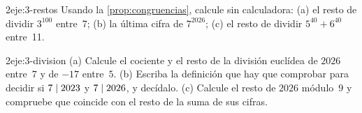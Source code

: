 \begin{ejercicio}{2}{eje:3-restos}
Usando la \cref{prop:congruencias}, calcule sin calculadora: (a) el resto de dividir $3^{100}$ entre~7; (b) la última cifra de $7^{2026}$; (c) el resto de dividir $5^{40}+6^{40}$ entre~11.
\end{ejercicio}

\begin{ejercicio}{2}{eje:3-division}
(a) Calcule el cociente y el resto de la división euclídea de $2026$ entre~$7$ y de $-17$ entre~$5$. (b) Escriba la definición que hay que comprobar para decidir si $7\mid 2023$ y $7\mid 2026$, y decídalo. (c) Calcule el resto de $2026$ módulo~$9$ y compruebe que coincide con el resto de la suma de sus cifras.
\end{ejercicio}

